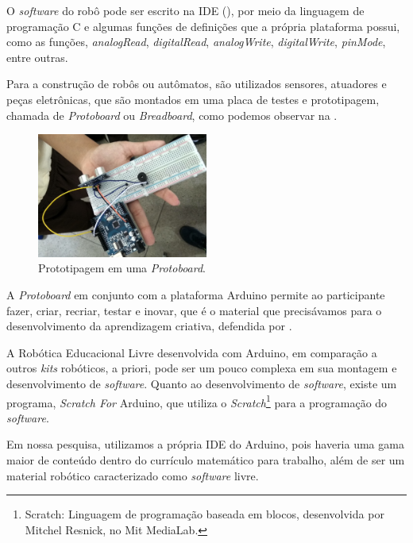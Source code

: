 \documentclass{textolivre}
\begin{document}
O \emph{software} do robô pode ser escrito na IDE (), por meio da linguagem de programação C e algumas funções de definições que a própria plataforma possui, como as funções, \emph{analogRead}, \emph{digitalRead}, \emph{analogWrite}, \emph{digitalWrite}, \emph{pinMode}, entre outras.

Para a construção de robôs ou autômatos, são utilizados sensores, atuadores e peças eletrônicas, que são montados em uma placa de testes e prototipagem, chamada de \emph{Protoboard} ou \emph{Breadboard}, como podemos observar na .

\begin{figure}[htbp]
 \centering
 \includegraphics[width=0.5\textwidth]{fig-004.png}
 \caption{Prototipagem em uma \emph{Protoboard}.}
 \label{fig4}
\end{figure}

A \emph{Protoboard} em conjunto com a plataforma Arduino permite ao participante fazer, criar, recriar, testar e inovar, que é o material que precisávamos para o desenvolvimento da aprendizagem criativa, defendida por \textcite{resnick2020}.

A Robótica Educacional Livre desenvolvida com Arduino, em comparação a outros \textit{kits} robóticos, a priori, pode ser um pouco complexa em sua montagem e desenvolvimento de \emph{software}. Quanto ao desenvolvimento de \textit{software}, existe um programa, \emph{Scratch For} Arduino, que utiliza o \emph{Scratch}\footnote{Scratch: Linguagem de programação baseada em blocos, desenvolvida por Mitchel Resnick, no Mit MediaLab.} para a programação do \emph{software}.

Em nossa pesquisa, utilizamos a própria IDE do Arduino, pois haveria uma gama maior de conteúdo dentro do currículo matemático para trabalho, além de ser um material robótico caracterizado como \emph{software} livre.
\end{document}
